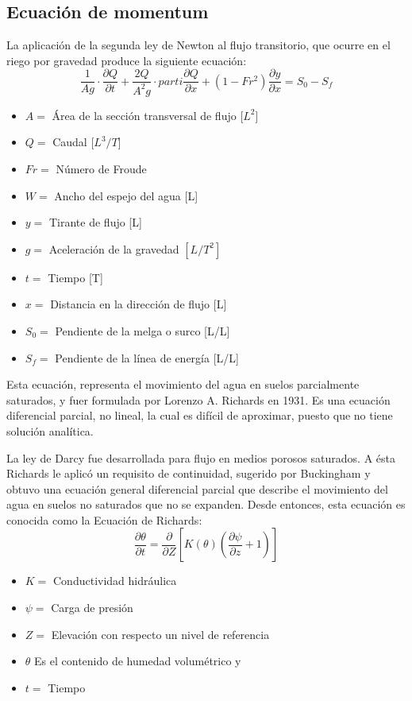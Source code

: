 \subsection{Ecuación de momentum}
La aplicación de la segunda ley de Newton al flujo transitorio, que ocurre en el riego por gravedad produce la siguiente ecuación:
\begin{equation}
    \frac{1}{Ag}\cdot \frac{\partial Q}{\partial t} + \frac{2Q}{A^2g} \cdot parti\frac{\partial Q}{\partial x} +\left(1 - Fr^2 \right)\frac{\partial y}{\partial x} = S_0 - S_f
\end{equation}
\begin{notation}
    \begin{itemize}
        \item $A=$ Área de la sección transversal de flujo [$L^2$]
        \item $Q=$ Caudal [$L^3/T$]
        \item $Fr=$ Número de Froude
        \item $W=$ Ancho del espejo del agua [L]
        \item $y=$ Tirante de flujo [L]
        \item $g=$ Aceleración de la gravedad $[L/T^2]$
        \item $t=$ Tiempo [T]
        \item $x=$ Distancia en la dirección de flujo [L]
        \item $S_0=$ Pendiente de la melga o surco [L/L]
        \item $S_f=$ Pendiente de la línea de energía [L/L]
    \end{itemize}
\end{notation}
Esta ecuación, representa el movimiento del agua en suelos parcialmente saturados, y fuer formulada por Lorenzo A. Richards en 1931. Es una ecuación diferencial parcial, no lineal, la cual es difícil de aproximar, puesto que no tiene solución analítica.

La ley de Darcy fue desarrollada para flujo en medios porosos saturados. A ésta Richards le aplicó un requisito de continuidad, sugerido por Buckingham y obtuvo una ecuación general diferencial parcial que describe el movimiento del agua en suelos no saturados que no se expanden. Desde entonces, esta ecuación es conocida como la Ecuación de Richards:
\begin{equation}
    \frac{\partial \theta}{\partial t} = \frac{\partial }{\partial Z} \left[ K(\theta) \left(\frac{\partial \psi }{\partial z} + 1 \right) \right] 
\end{equation}
\begin{notation}
    \begin{itemize}
        \item $K=$ Conductividad hidráulica
        \item $\psi=$ Carga de presión
        \item $Z=$ Elevación con respecto un nivel de referencia
        \item $\theta$ Es el contenido de humedad volumétrico y 
        \item $t=$ Tiempo
    \end{itemize}
\end{notation}
